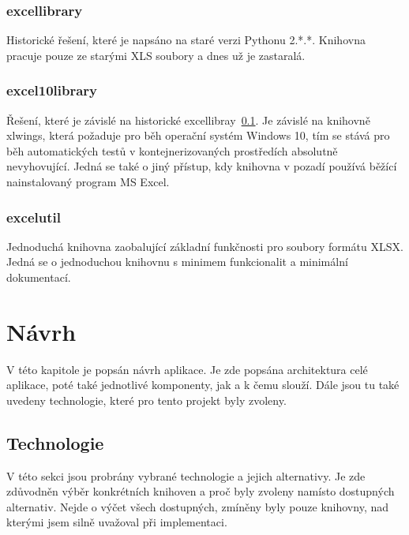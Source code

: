 \subsection{excellibrary}
\label{subsec:excellibrary}

Historické řešení, které je napsáno na staré verzi Pythonu 2.*.*. Knihovna pracuje pouze ze starými XLS soubory a dnes už je zastaralá.~\cite{excellibrary}

\subsection{excel10library}

Řešení, které je závislé na historické excellibray~\ref{subsec:excellibrary}. Je závislé na knihovně xlwings, která požaduje pro běh operační systém Windows 10, tím se stává pro běh automatických testů v kontejnerizovaných prostředích absolutně nevyhovující. Jedná se také o jiný přístup, kdy knihovna v pozadí používá běžící nainstalovaný program MS Excel.~\cite{excel10library}

\subsection{excelutil}

Jednoduchá knihovna zaobalující základní funkčnosti pro soubory formátu XLSX. Jedná se o jednoduchou knihovnu s minimem funkcionalit a minimální dokumentací.~\cite{excelutil}

\chapter{Návrh}

V této kapitole je popsán návrh aplikace. Je zde popsána architektura celé aplikace, poté také jednotlivé komponenty, jak a k čemu slouží. Dále jsou tu také uvedeny technologie, které pro tento projekt byly zvoleny.

\section{Technologie}

V této sekci jsou probrány vybrané technologie a jejich alternativy. Je zde zdůvodněn výběr konkrétních knihoven a proč byly zvoleny namísto dostupných alternativ. Nejde o výčet všech dostupných, zmíněny byly pouze knihovny, nad kterými jsem silně uvažoval při implementaci.


